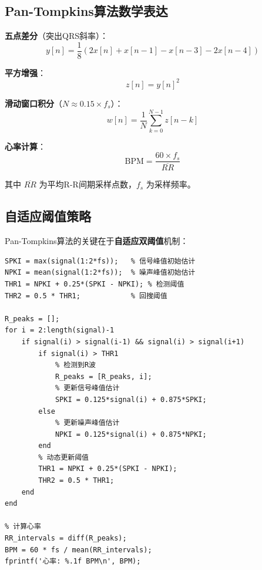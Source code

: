 \documentclass[12pt,a4paper]{ctexart}
\begin{document}
\subsection{Pan-Tompkins算法数学表达}

\textbf{五点差分}（突出QRS斜率）：
\begin{equation}
    y[n] = \frac{1}{8}\left(2x[n] + x[n\!-\!1] - x[n\!-\!3] - 2x[n\!-\!4]\right)
\end{equation}

\textbf{平方增强}：
\begin{equation}
    z[n] = y[n]^2
\end{equation}

\textbf{滑动窗口积分}（$N \approx 0.15 \times f_s$）：
\begin{equation}
    w[n] = \frac{1}{N}\sum_{k=0}^{N-1} z[n-k]
\end{equation}

\textbf{心率计算}：
\begin{equation}
    \text{BPM} = \frac{60 \times f_s}{\overline{RR}}
\end{equation}

其中 $\overline{RR}$ 为平均R-R间期采样点数，$f_s$ 为采样频率。

\subsection{自适应阈值策略}

Pan-Tompkins算法的关键在于\textbf{自适应双阈值}机制：

\begin{lstlisting}[style=matlabstyle, caption={Pan-Tompkins自适应阈值R波检测}]
% 初始化阈值
SPKI = max(signal(1:2*fs));   % 信号峰值初始估计
NPKI = mean(signal(1:2*fs));  % 噪声峰值初始估计
THR1 = NPKI + 0.25*(SPKI - NPKI); % 检测阈值
THR2 = 0.5 * THR1;            % 回搜阈值

R_peaks = [];
for i = 2:length(signal)-1
    if signal(i) > signal(i-1) && signal(i) > signal(i+1)
        if signal(i) > THR1
            % 检测到R波
            R_peaks = [R_peaks, i];
            % 更新信号峰值估计
            SPKI = 0.125*signal(i) + 0.875*SPKI;
        else
            % 更新噪声峰值估计
            NPKI = 0.125*signal(i) + 0.875*NPKI;
        end
        % 动态更新阈值
        THR1 = NPKI + 0.25*(SPKI - NPKI);
        THR2 = 0.5 * THR1;
    end
end

% 计算心率
RR_intervals = diff(R_peaks);
BPM = 60 * fs / mean(RR_intervals);
fprintf('心率: %.1f BPM\n', BPM);
\end{lstlisting}
\end{document}
